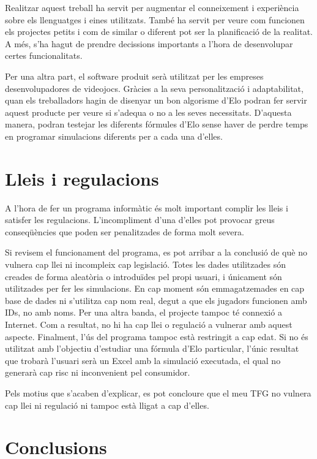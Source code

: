 \documentclass[a4paper]{article}
\begin{document}
Realitzar aquest treball ha servit per augmentar el conneixement i experiència sobre els llenguatges i eines utilitzats. També ha servit per veure com funcionen els projectes petits i com de similar o diferent pot ser la planificació de la realitat. A més, s'ha hagut de prendre decissions importants a l'hora de desenvolupar certes funcionalitats.

\newpage
Per una altra part, el software produit serà utilitzat per les empreses desenvolupadores de videojocs. Gràcies a la seva personalització i adaptabilitat, quan els treballadors hagin de disenyar un bon algorisme d'Elo podran fer servir aquest producte per veure si s'adequa o no a les seves necessitats. D'aquesta manera, podran testejar les diferents fórmules d'Elo sense haver de perdre temps en programar simulacions diferents per a cada una d'elles.

\section{Lleis i regulacions}
A l'hora de fer un programa informàtic és molt important complir les lleis i satisfer les regulacions. L'incompliment d'una d'elles pot provocar greus conseqüències que poden ser penalitzades de forma molt severa. 

Si revisem el funcionament del  programa, es pot arribar a la conclusió de què no vulnera cap llei ni incompleix cap legislació. Totes les dades utilitzades són creades de forma aleatòria o introduïdes pel propi usuari, i únicament són utilitzades per fer les simulacions. En cap moment són emmagatzemades en cap base de dades ni s'utilitza cap nom real, degut a que els jugadors funcionen amb IDs, no amb noms. 
Per una altra banda, el projecte tampoc té connexió a Internet. Com a resultat, no hi ha cap llei o regulació a vulnerar amb aquest aspecte. Finalment, l'ús del programa tampoc està restringit a cap edat. Si no és utilitzat amb l'objectiu d'estudiar una fórmula d'Elo particular, l'únic resultat que trobarà l'usuari serà un Excel amb la simulació executada, el qual no generarà cap risc ni inconvenient pel consumidor.

Pels motius que s'acaben d'explicar, es pot concloure que el meu TFG no vulnera cap llei ni regulació ni tampoc està lligat a cap d'elles.

\newpage
\section{Conclusions}
\end{document}
